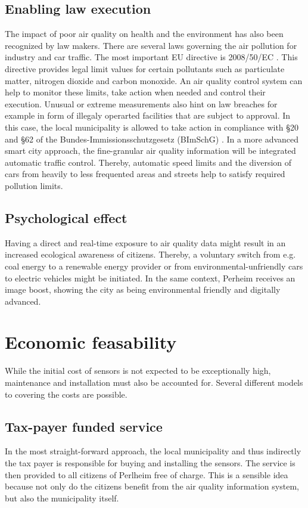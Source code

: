 \documentclass[conference]{IEEEtran}
\begin{document}
\subsection{Enabling law execution}
The impact of poor air quality on health and the environment has also been recognized by law makers. There are several laws governing the air pollution for industry and car traffic. The most important EU directive is 2008/50/EC \cite{EurpoeanUnion.2008}. This directive provides legal limit values for certain pollutants such as particulate matter, nitrogen dioxide and carbon monoxide. An air quality control system can help to monitor these limits, take action when needed and control their execution. Unusual or extreme measurements also hint on law breaches for example in form of illegaly operarted facilities that are subject to approval. In this case, the local municipality is allowed to take action in compliance with \S20 and \S62 of the Bundes-Immissionsschutzgesetz (BImSchG) \cite{BundesrepublikDeutschland.1974}. In a more advanced smart city approach, the fine-granular air quality information will be integrated automatic traffic control. Thereby, automatic speed limits and the diversion of cars from heavily to less frequented areas and streets help to satisfy required pollution limits.

\subsection{Psychological effect}
Having a direct and real-time exposure to air quality data might result in an increased ecological awareness of citizens. Thereby, a voluntary switch from e.g. coal energy to a renewable energy provider or from environmental-unfriendly cars to electric vehicles might be initiated. In the same context, Perheim receives an image boost, showing the city as being environmental friendly and digitally advanced.

\section{Economic feasability}
While the initial cost of sensors is not expected to be exceptionally high, maintenance and installation must also be accounted for. Several different models to covering the costs are possible.

\subsection{Tax-payer funded service}
In the most straight-forward approach, the local municipality and thus indirectly the tax payer is responsible for buying and installing the sensors. The service is then provided to all citizens of Perlheim free of charge. This is a sensible idea because not only do the citizens benefit from the air quality information system, but also the municipality itself.
\end{document}
